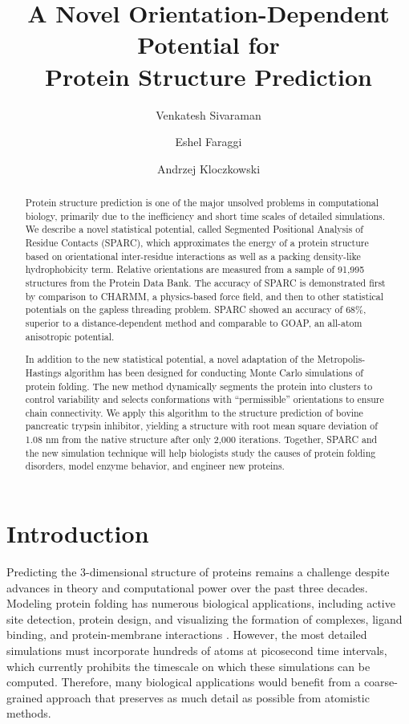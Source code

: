 \documentclass[11pt,titlepage]{article}
\title{A Novel Orientation-Dependent Potential for \\Protein Structure Prediction}
\author[1]{Venkatesh Sivaraman}
\author[2,3]{Eshel Faraggi}
\author[3]{Andrzej Kloczkowski}
\affil[1]{Bexley High School}
\affil[2]{Indiana University School of Medicine}
\affil[3]{Nationwide Children's Hospital}
\begin{document}
\maketitle

\raggedbottom

\begin{abstract}
Protein structure prediction is one of the major unsolved problems in computational biology, primarily due to the inefficiency and short time scales of detailed simulations. We describe a novel statistical potential, called Segmented Positional Analysis of Residue Contacts (SPARC), which approximates the energy of a protein structure based on orientational inter-residue interactions as well as a packing density-like hydrophobicity term. Relative orientations are measured from a sample of 91,995 structures from the Protein Data Bank. The accuracy of SPARC is demonstrated first by comparison to CHARMM, a physics-based force field, and then to other statistical potentials on the gapless threading problem. SPARC showed an accuracy of 68\%, superior to a distance-dependent method and comparable to GOAP, an all-atom anisotropic potential.

In addition to the new statistical potential, a novel adaptation of the Metropolis-Hastings algorithm has been designed for conducting Monte Carlo simulations of protein folding. The new method dynamically segments the protein into clusters to control variability and selects conformations with ``permissible'' orientations to ensure chain connectivity. We apply this algorithm to the structure prediction of bovine pancreatic trypsin inhibitor, yielding a structure with root mean square deviation of 1.08 nm from the native structure after only 2,000 iterations. Together, SPARC and the new simulation technique will help biologists study the causes of protein folding disorders, model enzyme behavior, and engineer new proteins.
\end{abstract}

\section{Introduction}
Predicting the 3-dimensional structure of proteins remains a challenge despite advances in theory and computational power over the past three decades.
Modeling protein folding has numerous biological applications, including active site detection, protein design, and visualizing the formation of complexes, ligand binding, and protein-membrane interactions \cite{baker2,kouza,monticelli}.
However, the most detailed simulations must incorporate hundreds of atoms at picosecond time intervals, which currently prohibits the timescale on which these simulations can be computed.
Therefore, many biological applications would benefit from a coarse-grained approach that preserves as much detail as possible from atomistic methods.
\end{document}
